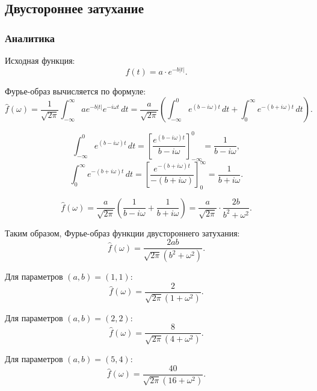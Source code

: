 \documentclass[a4paper,12pt]{article}
\begin{document}
\subsection{Двустороннее затухание}
\subsubsection{Аналитика}

Исходная функция:
\[
f(t) = a \cdot e^{-b |t|}.
\]

Фурье-образ вычисляется по формуле:
\[
\hat{f}(\omega) = \frac{1}{\sqrt{2\pi}} \int_{-\infty}^{\infty} a e^{-b |t|} e^{-i\omega t} \, dt = \frac{a}{\sqrt{2\pi}} \left( \int_{-\infty}^{0} e^{(b - i\omega) t} \, dt + \int_{0}^{\infty} e^{-(b + i\omega) t} \, dt \right).
\]

\[
\int_{-\infty}^{0} e^{(b - i\omega) t} \, dt = \left[ \frac{e^{(b - i\omega) t}}{b - i\omega} \right]_{-\infty}^{0} = \frac{1}{b - i\omega},
\]
\[
\int_{0}^{\infty} e^{-(b + i\omega) t} \, dt = \left[ \frac{e^{-(b + i\omega) t}}{-(b + i\omega)} \right]_{0}^{\infty} = \frac{1}{b + i\omega}.
\]

\[
\hat{f}(\omega) = \frac{a}{\sqrt{2\pi}} \left( \frac{1}{b - i\omega} + \frac{1}{b + i\omega} \right) = \frac{a}{\sqrt{2\pi}} \cdot \frac{2b}{b^2 + \omega^2}.
\]

Таким образом, Фурье-образ функции двустороннего затухания:
\[
\hat{f}(\omega) = \frac{2ab}{\sqrt{2\pi} (b^2 + \omega^2)}.
\]


Для параметров \( (a, b) = (1, 1) \):
\[
\hat{f}(\omega) = \frac{2}{\sqrt{2\pi} (1 + \omega^2)}.
\]

Для параметров \( (a, b) = (2, 2) \):
\[
\hat{f}(\omega) = \frac{8}{\sqrt{2\pi} (4 + \omega^2)}.
\]

Для параметров \( (a, b) = (5, 4) \):
\[
\hat{f}(\omega) = \frac{40}{\sqrt{2\pi} (16 + \omega^2)}.
\]
\end{document}
